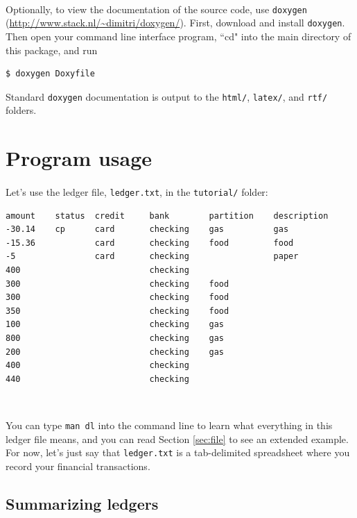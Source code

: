 \documentclass{article}
\providecommand{\q}{$\quad$ \newline}
\begin{document}
\begin{flushleft}
\paragraph{} Optionally, to view the documentation of the source code, use {\tt doxygen} (\url{http://www.stack.nl/~dimitri/doxygen/}). First, download and install {\tt doxygen}. Then open your command line interface program, ``cd" into the main directory of this package, and run

\begin{lstlisting}
$ doxygen Doxyfile
\end{lstlisting}

Standard {\tt doxygen} documentation is output to the {\tt html/}, {\tt latex/}, and {\tt rtf/} folders.


\section{Program usage}

\paragraph{} Let's use the ledger file, {\tt ledger.txt}, in the {\tt tutorial/} folder:

\begin{lstlisting}[title=ledger.txt]
amount    status  credit     bank        partition    description
-30.14    cp      card       checking    gas          gas
-15.36            card       checking    food         food
-5                card       checking                 paper
400                          checking
300                          checking    food
300                          checking    food
350                          checking    food
100                          checking    gas
800                          checking    gas
200                          checking    gas
400                          checking
440                          checking
\end{lstlisting} \q
 
You can type {\tt man dl} into the command line to learn what everything in this ledger file means, and you can read Section \ref{sec:file} to see an extended example. For now, let's just say that {\tt ledger.txt} is a tab-delimited spreadsheet where you record your financial transactions.

\subsection{Summarizing ledgers}


\end{flushleft}
\end{document}
